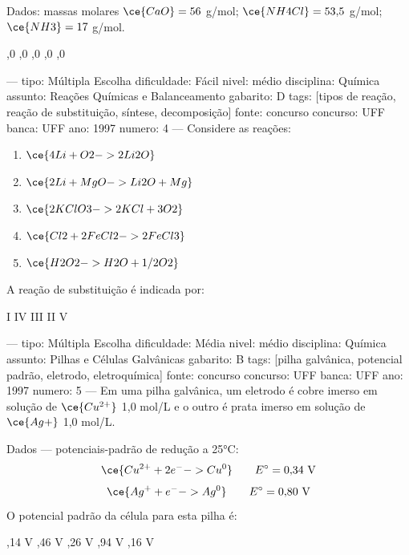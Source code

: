 Dados: massas molares $\ce{CaO} = 56$ g/mol; $\ce{NH4Cl} = 53{,}5$ g/mol; $\ce{NH3} = 17$ g/mol.
\begin{choices}
,0
,0
,0
,0
,0
\end{choices}

---
tipo: Múltipla Escolha
dificuldade: Fácil
nivel: médio
disciplina: Química
assunto: Reações Químicas e Balanceamento
gabarito: D
tags: [tipos de reação, reação de substituição, síntese, decomposição]
fonte: concurso
concurso: UFF
banca: UFF
ano: 1997
numero: 4
---
\question
Considere as reações:
\begin{enumerate}
\item $\ce{4 Li + O2 -> 2 Li2O}$
\item $\ce{2 Li + MgO -> Li2O + Mg}$
\item $\ce{2 KClO3 -> 2 KCl + 3 O2}$
\item $\ce{Cl2 + 2 FeCl2 -> 2 FeCl3}$
\item $\ce{H2O2 -> H2O + 1/2 O2}$
\end{enumerate}
A reação de substituição é indicada por:
\begin{choices}
\choice I
\choice IV
\choice III
\CorrectChoice II
\choice V
\end{choices}

---
tipo: Múltipla Escolha
dificuldade: Média
nivel: médio
disciplina: Química
assunto: Pilhas e Células Galvânicas
gabarito: B
tags: [pilha galvânica, potencial padrão, eletrodo, eletroquímica]
fonte: concurso
concurso: UFF
banca: UFF
ano: 1997
numero: 5
---
\question
Em uma pilha galvânica, um eletrodo é cobre imerso em solução de $\ce{Cu^{2+}}$ 1,0 mol/L e o outro é prata imerso em solução de $\ce{Ag+}$ 1,0 mol/L.

Dados --- potenciais-padrão de redução a 25°C:
$$\ce{Cu^{2+} + 2 e^{-} -> Cu^0} \qquad E^\circ = 0{,}34 \text{ V}$$
$$\ce{Ag^{+} + e^{-} -> Ag^0} \qquad E^\circ = 0{,}80 \text{ V}$$
O potencial padrão da célula para esta pilha é:
\begin{choices}
,14 V
,46 V
,26 V
,94 V
,16 V
\end{choices}

